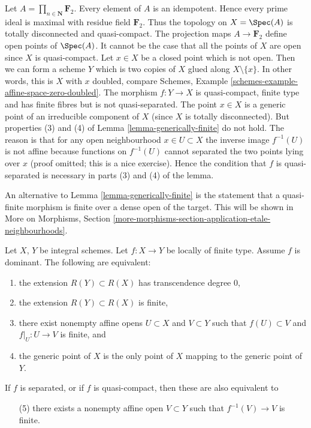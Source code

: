 \begin{example}
\label{example-counter-generically-finite}
Let $A = \prod_{n \in \mathbf{N}} \mathbf{F}_2$.
Every element of $A$ is an idempotent. Hence every prime ideal is maximal
with residue field $\mathbf{F}_2$.
Thus the topology on $X = \Spec(A)$ is totally disconnected
and quasi-compact. The projection maps $A \to \mathbf{F}_2$ define open
points of $\Spec(A)$. It cannot be the case that all the points
of $X$ are open since $X$ is quasi-compact. Let $x \in X$ be a closed
point which is not open. Then we can form a scheme $Y$ which is two
copies of $X$ glued along $X \setminus \{x\}$. In other words, this
is $X$ with $x$ doubled, compare
Schemes, Example \ref{schemes-example-affine-space-zero-doubled}.
The morphism
$f : Y \to X$ is quasi-compact, finite type and has finite fibres
but is not quasi-separated.
The point $x \in X$ is a generic point of an irreducible component
of $X$ (since $X$ is totally disconnected). But properties (3) and (4)
of Lemma \ref{lemma-generically-finite} do not hold. The reason is that
for any open neighbourhood $x \in U \subset X$ the inverse image
$f^{-1}(U)$ is not affine because functions on $f^{-1}(U)$ cannot
separated the two points lying over $x$ (proof omitted; this is a
nice exercise). Hence the condition that $f$ is quasi-separated is
necessary in parts (3) and (4) of the lemma.
\end{example}

\begin{remark}
\label{remark-quasi-finite-finite-over-dense-open}
An alternative to
Lemma \ref{lemma-generically-finite}
is the statement that a quasi-finite morphism is finite
over a dense open of the target. This will be shown in
More on Morphisms,
Section \ref{more-morphisms-section-application-etale-neighbourhoods}.
\end{remark}

\begin{lemma}
\label{lemma-finite-degree}
Let $X$, $Y$ be integral schemes.
Let $f : X \to Y$ be locally of finite type.
Assume $f$ is dominant.
The following are equivalent:
\begin{enumerate}
\item the extension $R(Y) \subset R(X)$ has
transcendence degree $0$,
\item the extension $R(Y) \subset R(X)$ is finite,
\item there exist nonempty affine opens $U \subset X$
and $V \subset Y$ such that $f(U) \subset V$
and $f|_U : U \to V$ is finite, and
\item the generic point of $X$ is the only point of $X$ mapping to
the generic point of $Y$.
\end{enumerate}
If $f$ is separated, or if $f$ is quasi-compact, then these are
also equivalent to
\begin{enumerate}
\item[(5)] there exists a nonempty affine open $V \subset Y$ such
that $f^{-1}(V) \to V$ is finite.
\end{enumerate}
\end{lemma}


